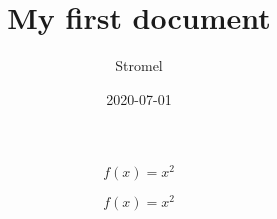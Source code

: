\documentclass{article}
\title{My first document}
\date{2020-07-01}
\author{Stromel}
\begin{document}
	\maketitle
	\newpage
	
	\begin{equation}
		f(x) = x^2
	\end{equation}
	
	\begin{equation*}
		f(x) = x^2
	\end{equation*}
\end{document}
